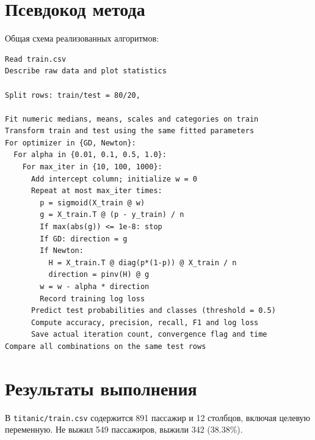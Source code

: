 \documentclass[a4paper,12pt]{article}
\begin{document}
\section{Псевдокод метода}

Общая схема реализованных алгоритмов:
\begin{verbatim}
Read train.csv
Describe raw data and plot statistics

Split rows: train/test = 80/20,

Fit numeric medians, means, scales and categories on train
Transform train and test using the same fitted parameters
For optimizer in {GD, Newton}:
  For alpha in {0.01, 0.1, 0.5, 1.0}:
    For max_iter in {10, 100, 1000}:
      Add intercept column; initialize w = 0
      Repeat at most max_iter times:
        p = sigmoid(X_train @ w)
        g = X_train.T @ (p - y_train) / n
        If max(abs(g)) <= 1e-8: stop
        If GD: direction = g
        If Newton:
          H = X_train.T @ diag(p*(1-p)) @ X_train / n
          direction = pinv(H) @ g
        w = w - alpha * direction
        Record training log loss
      Predict test probabilities and classes (threshold = 0.5)
      Compute accuracy, precision, recall, F1 and log loss
      Save actual iteration count, convergence flag and time
Compare all combinations on the same test rows
\end{verbatim}

\section{Результаты выполнения}

В \texttt{titanic/train.csv} содержится 891 пассажир и 12 столбцов, включая целевую переменную. Не выжил 549 пассажиров, выжили 342 (38.38\%).

\begin{table}[H]
\centering
\caption{Описательная статистика исходных числовых столбцов}
\small
{}
\end{table}
\end{document}
